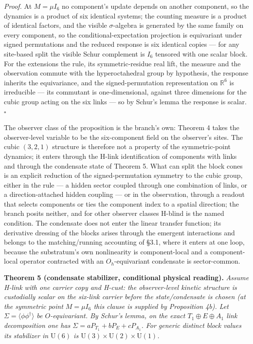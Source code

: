 \documentclass[
]{article}
\begin{document}
\emph{Proof.} At \(M=\mu I_6\) no component's update depends on another
component, so the dynamics is a product of six identical systems; the
counting measure is a product of identical factors, and the visible
\(\sigma\)-algebra is generated by the same family on every component,
so the conditional-expectation projection is equivariant under signed
permutations and the reduced response is six identical copies --- for
any site-based split the visible Schur complement is \(I_6\) tensored
with one scalar block. For the extensions the rule, its
symmetric-residue real lift, the measure and the observation commute
with the hyperoctahedral group by hypothesis, the response inherits the
equivariance, and the signed-permutation representation on
\(\mathbb R^6\) is irreducible --- its commutant is one-dimensional,
against three dimensions for the cubic group acting on the six links ---
so by Schur's lemma the response is scalar. \(\square\)

The observer class of the proposition is the branch's own: Theorem 4
takes the observer-level variable to be the six-component field on the
observer's sites. The cubic \((3,2,1)\) structure is therefore not a
property of the symmetric-point dynamics; it enters through the H-link
identification of components with links and through the condensate state
of Theorem 5. What can split the block cones is an explicit reduction of
the signed-permutation symmetry to the cubic group, either in the rule
--- a hidden sector coupled through one combination of links, or a
direction-attached hidden coupling --- or in the observation, through a
readout that selects components or ties the component index to a spatial
direction; the branch posits neither, and for other observer classes
H-blind is the named condition. The condensate does not enter the linear
transfer function; its derivative dressing of the blocks arises through
the emergent interactions and belongs to the matching/running accounting
of §3.1, where it enters at one loop, because the substratum's own
nonlinearity is component-local and a component-local operator
contracted with an \(O_h\)-equivariant condensate is sector-common.

\textbf{Theorem 5 (condensate stabilizer, conditional physical
reading).} \emph{Assume H-link with one carrier copy and H-cust: the
observer-level kinetic structure is custodially scalar on the six-link
carrier before the state/condensate is chosen (at the symmetric point
\(M=\mu I_6\) this clause is supplied by Proposition 4b). Let
\(\Sigma=\langle\phi\phi^\dagger\rangle\) be \(O\)-equivariant. By
Schur's lemma, on the exact \(T_1\oplus E\oplus A_1\) link decomposition
one has \(\Sigma=aP_{T_1}+bP_E+cP_{A_1}\). For generic distinct block
values its stabilizer in \(\mathrm U(6)\) is
\(\mathrm U(3)\times\mathrm U(2)\times\mathrm U(1)\).}
\end{document}
